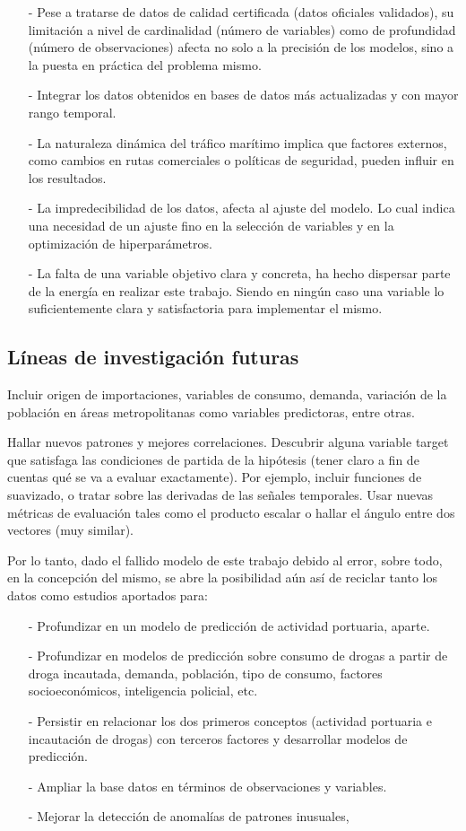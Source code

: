 \documentclass[12pt]{article}
\begin{document}
	\begin{itemize}
		\item [-] Pese a tratarse de datos de calidad certificada (datos oficiales validados), su limitación a nivel de cardinalidad (número de variables) como de profundidad (número de observaciones) afecta no solo a la precisión de los modelos, sino a la puesta en práctica del problema mismo.
		\item [-] Integrar los datos obtenidos en bases de datos más actualizadas y con mayor rango temporal.
		\item [-] La naturaleza dinámica del tráfico marítimo implica que factores externos, como cambios en rutas comerciales o políticas de seguridad, pueden influir en los resultados.
		\item [-] La impredecibilidad de los datos, afecta al ajuste del modelo. Lo cual indica una necesidad de un ajuste fino en la selección de variables y en la optimización de hiperparámetros.
		\item [-] La falta de una variable objetivo clara y concreta, ha hecho dispersar parte de la energía en realizar este trabajo. Siendo en ningún caso una variable lo suficientemente clara y satisfactoria para implementar el mismo.
	\end{itemize}
	
	\subsection{Líneas de investigación futuras}
	Incluir origen de importaciones, variables de consumo, demanda, variación de la población en áreas metropolitanas como variables predictoras, entre otras.
	
	Hallar nuevos patrones y  mejores correlaciones. Descubrir alguna variable target que satisfaga las condiciones de partida de la hipótesis (tener claro a fin de cuentas qué se va a evaluar exactamente). Por ejemplo, incluir funciones de suavizado, o tratar sobre las derivadas de las señales temporales. Usar nuevas métricas de evaluación tales como el producto escalar o hallar el ángulo entre dos vectores (muy similar).
	
	Por lo tanto, dado el fallido modelo de este trabajo debido al error, sobre todo, en la concepción del mismo, se abre la posibilidad aún así de reciclar tanto los datos como estudios aportados para:
	\begin{itemize}
		\item [-] Profundizar en un modelo de predicción de actividad portuaria, aparte.
		\item [-] Profundizar en modelos de predicción sobre consumo de drogas a partir de droga incautada, demanda, población, tipo de consumo, factores socioeconómicos, inteligencia policial, etc.
		\item[-] Persistir en relacionar los dos primeros conceptos (actividad portuaria e incautación de drogas) con terceros factores y desarrollar modelos de predicción.
		\item [-] Ampliar la base datos en términos de observaciones y variables.
		\item [-] Mejorar la detección de anomalías de patrones inusuales,
	\end{itemize} 
\end{document}
